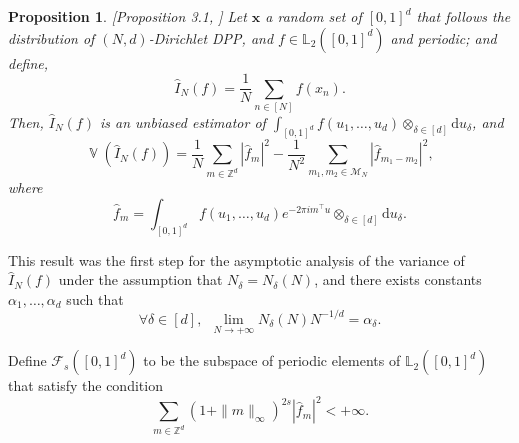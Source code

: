 \documentclass[twoside,11pt]{book}
\newtheorem{proposition}{Proposition}
\DeclareMathOperator{\Tran}{\intercal}
\DeclareMathOperator{\Var}{\mathbb{V}}
\begin{document}
\begin{proposition}\label{prop:dirichlet_estimator} [Proposition 3.1, \citep{CoMaAm20} ]
Let $\bm{x}$ a random set of $[0,1]^{d}$ that follows the distribution of $(N,d)$-Dirichlet DPP, and $f \in \mathbb{L}_{2}([0,1]^{d})$ and periodic; and define, 
\begin{equation}
\hat{I}_{N}(f) =  \frac{1}{N} \sum\limits_{n \in [N]}f(x_{n}).
\end{equation}
Then, $\hat{I}_{N}(f)$ is an unbiased estimator of $\displaystyle \int_{[0,1]^{d}} f(u_{1}, \dots, u_{d}) \otimes_{\delta \in [d]} \mathrm{d}u_{\delta}$, and
\begin{equation}
\Var (\hat{I}_{N}(f)) = \frac{1}{N}\sum\limits_{m \in \mathbb{Z}^{d}} |\hat{f}_{m}|^{2} - \frac{1}{N^2} \sum\limits_{m_{1},m_{2} \in \mathcal{M}_{N}} |\hat{f}_{m_{1}-m_{2}}|^{2},
\end{equation}
where
\begin{equation}
 \hat{f}_{m} = \int_{[0,1]^{d}}f(u_{1}, \dots, u_{d}) e^{- 2\pi i m^{\Tran}u} \otimes_{\delta \in [d]} \mathrm{d}u_{\delta}.
\end{equation}


\end{proposition}


This result was the first step for the asymptotic analysis of the variance of $\hat{I}_{N}(f)$ under the assumption that $N_{\delta} = N_{\delta}(N)$, and there exists constants $\alpha_{1}, \dots, \alpha_{d}$ such that
\begin{equation}
\forall \delta \in [d], \:\:\lim\limits_{N \rightarrow +\infty} N_{\delta}(N)N^{-1/d} = \alpha_{\delta}.
\end{equation}

Define $\mathcal{F}_{s}([0,1]^{d})$ to be the subspace of periodic elements of $\mathbb{L}_{2}([0,1]^{d})$ that satisfy the condition
\begin{equation}
\sum\limits_{m \in \mathbb{Z}^{d}} (1+ \|m\|_{\infty})^{2s} |\hat{f}_{m}|^{2} < +\infty.
\end{equation}
\end{document}
